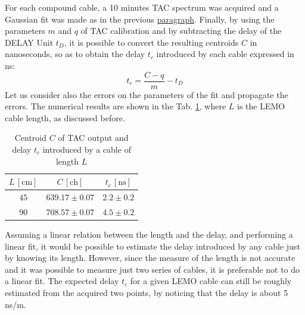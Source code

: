 \documentclass[a4paper]{article}
\begin{document}
For each compound cable, a 10 minutes TAC spectrum was acquired and a Gaussian fit was made as in the previous \hyperlink{2.3.1}{paragraph}. Finally, by using the parameters $m$ and $q$ of TAC calibration and by subtracting the delay of the DELAY Unit $t_D$, it is possible to convert the resulting centroids $C$ in nanoseconds, so as to obtain the delay $t_c$ introduced by each cable expressed in ns:
\begin{equation}\label{eq:conversion}
    t_c=\dfrac{C-q}{m}-t_D
\end{equation}
Let us consider also the errors on the parameters of the fit and propagate the errors. %
The numerical results %
are shown in the Tab. \ref{tab:cable_cal}, %
where $L$ is the LEMO cable length, as discussed before.

\begin{table}[H]
    \centering \captionsetup{width=.55\linewidth}
    \begin{tabular}{|c|cc|}
    \hline
    $L\,\left[\mathrm{cm}\right]$ & $C\,\left[\mathrm{ch}\right]$ & $t_c\,\left[\mathrm{ns}\right]$ \\
    \hline
    $45$ & $639.17\pm0.07$ & $2.2\pm0.2$ \\ 
    $90$ & $708.57\pm0.07$ & $4.5\pm0.2$\\ 
    \hline
    \end{tabular}
    \caption{Centroid $C$ of TAC output and delay $t_c$ introduced by a cable of length $L$}
    \label{tab:cable_cal}
\end{table}

Assuming a linear relation between the length and the delay, and %
performing a linear fit, 
it would be possible to 
estimate the delay introduced by any cable just by knowing its length. However, since the measure of the length is not accurate and it was possible to measure just two series of cables, it is preferable not to do a linear fit. The expected delay $t_c$ for a given LEMO cable can still be roughly estimated from the acquired two points, by noticing that the delay is about 5 ns/m.
\end{document}
